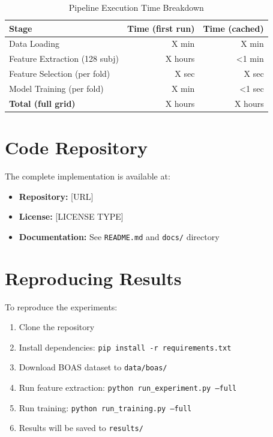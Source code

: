 \begin{table}[htbp]
    \centering
    \caption{Pipeline Execution Time Breakdown}
    \begin{tabular}{lrr}
        \toprule
        \textbf{Stage} & \textbf{Time (first run)} & \textbf{Time (cached)} \\
        \midrule
        Data Loading & X min & X min \\
        Feature Extraction (128 subj) & X hours & <1 min \\
        Feature Selection (per fold) & X sec & X sec \\
        Model Training (per fold) & X min & <1 sec \\
        \midrule
        \textbf{Total (full grid)} & X hours & X hours \\
        \bottomrule
    \end{tabular}
\end{table}

\section{Code Repository}
\label{app:code_repository}

The complete implementation is available at:

\begin{itemize}
    \item \textbf{Repository:} [URL]
    \item \textbf{License:} [LICENSE TYPE]
    \item \textbf{Documentation:} See \texttt{README.md} and \texttt{docs/} directory
\end{itemize}

\section{Reproducing Results}
\label{app:reproduction}

To reproduce the experiments:

\begin{enumerate}
    \item Clone the repository
    \item Install dependencies: \texttt{pip install -r requirements.txt}
    \item Download BOAS dataset to \texttt{data/boas/}
    \item Run feature extraction: \texttt{python run\_experiment.py --full}
    \item Run training: \texttt{python run\_training.py --full}
    \item Results will be saved to \texttt{results/}
\end{enumerate}

